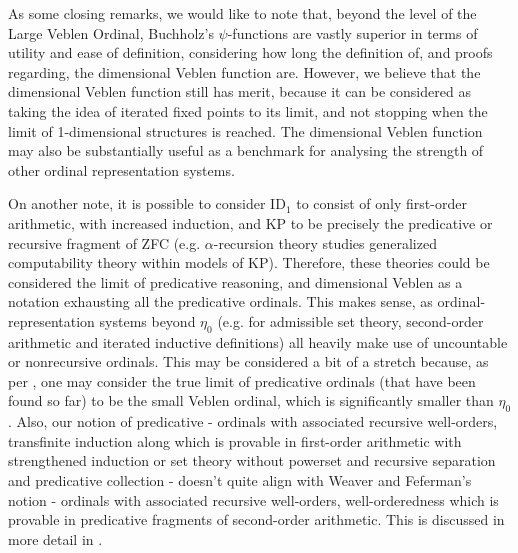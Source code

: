 \documentclass{article}
\theoremstyle{definition}
\theoremstyle{plain}
\theoremstyle{plain}
\theoremstyle{plain}
\theoremstyle{plain}
\theoremstyle{remark}
\theoremstyle{remark}
\theoremstyle{remark}
\theoremstyle{plain}
\theoremstyle{plain}
\begin{document}
As some closing remarks, we would like to note that, beyond the level of the Large Veblen Ordinal, Buchholz's $\psi$-functions are vastly superior in terms of utility and ease of definition, considering how long the definition of, and proofs regarding, the dimensional Veblen function are. However, we believe that the dimensional Veblen function still has merit, because it can be considered as taking the idea of iterated fixed points to its limit, and not stopping when the limit of 1-dimensional structures is reached. The dimensional Veblen function may also be substantially useful as a benchmark for analysing the strength of other ordinal representation systems.

On another note, it is possible to consider $\mathrm{ID}_1$ to consist of only first-order arithmetic, with increased induction, and $\mathrm{KP}$ to be precisely the predicative or recursive fragment of ZFC (e.g. $\alpha$-recursion theory studies generalized computability theory within models of $\mathrm{KP}$). Therefore, these theories could be considered the limit of predicative reasoning, and dimensional Veblen as a notation exhausting all the predicative ordinals. This makes sense, as ordinal-representation systems beyond $\eta_0$ (e.g. for admissible set theory, second-order arithmetic and iterated inductive definitions) all heavily make use of uncountable or nonrecursive ordinals. This may be considered a bit of a stretch because, as per \cite{weaver}, one may consider the true limit of predicative ordinals (that have been found so far) to be the small Veblen ordinal, which is significantly smaller than $\eta_0$. Also, our notion of predicative - ordinals with associated recursive well-orders, transfinite induction along which is provable in first-order arithmetic with strengthened induction or set theory without powerset and recursive separation and predicative collection - doesn't quite align with Weaver and Feferman's notion - ordinals with associated recursive well-orders, well-orderedness which is provable in predicative fragments of second-order arithmetic. This is discussed in more detail in \cite{weaver}.
\end{document}
